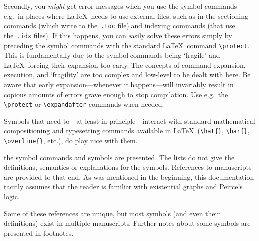 \documentclass[a4paper,justified]{tufte-handout}
\newcommand{\lm}{\fontfamily{cmr}\selectfont}
\begin{document}
Secondly, you \textit{might} get error messages when you use the symbol commands e.g.\ in places where \LaTeX\ needs to use external files, such as in the sectioning commands (which write to the~\texttt{.toc} file) and indexing commands (that use the~\texttt{.idx} files). If this happens, you can easily solve these errors simply by preceding the symbol commands with the standard \LaTeX\ command \verb|\protect|. This is fundamentally due to the symbol commands being `fragile' and \LaTeX\ forcing their expansion too early. The concepts of command expansion, execution, and `fragility' are too complex and low-level to be dealt with here. Be aware that early expansion---whenever it happens---will invariably result in copious amounts of errors grave enough to stop compilation. Use e.g.\ the \verb|\protect| or \verb|\expandafter| commands when needed.\marginnote[16pt]{\lm%
$\breve{\weirdthree} \hfill \bar{\reversedragonhead}$ \hfill A $\hat{\boxxoperator{l}}$ B \hfill $\overline{\varinclusion}$ \hfill $\widehat{a \aggregate b}$ \hfill $a\ \underleftarrow{\Ppropto}\ b$ \hfill $\displaystyle\prod_{\aggregate\in\ i}^{\flatinfty}$
\\\\
$\overbrace{a\ \aggregate\ b\ \aggregate\ c\ \cdots\ k\ \aggregate\ l\ \aggregate\ m }$
}\medskip

\noindent Symbols that need to---at least in principle---interact with standard mathematical compositioning and typesetting commands available in \LaTeX\ (\verb|\hat{}|, \verb|\bar{}|, \verb|\overline{}|, etc.), do play nice with them.

 the symbol commands and symbols are presented. The lists do not give the definitions, semantics or explanations for the symbols. References to manuscripts are provided to that end. As was mentioned in the beginning, this documentation tacitly assumes that the reader is familiar with existential graphs and Peirce's logic.

Some of these references are unique, but most symbols (and even their definitions) exist in multiple manuscripts. Further notes about some symbols are presented in footnotes.
\end{document}
